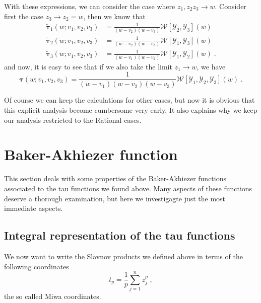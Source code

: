 \documentclass[a4paper,12pt]{amsart}
\begin{document}
With these expressions, we can consider the case where \(z_1, z_2 z_3
\to w\). Consider first the case \(z_3 \to z_2 = w\), then  
we know that 
\begin{equation}
  \begin{split}
  \tilde{\bm{\tau}}_1(w; v_1 , v_2, v_3) & = \frac{1}{(w - v_2)(w - v_3)}\mathcal{W}[\mathcal{Y}_2, \mathcal{Y}_3](w)\\
  \tilde{\bm{\tau}}_2(w; v_1 , v_2, v_3) & = \frac{1}{(w - v_2)(w - v_3)}\mathcal{W}[\mathcal{Y}_1, \mathcal{Y}_3](w)\\
  \tilde{\bm{\tau}}_3(w; v_1 , v_2, v_3) & = \frac{1}{(w - v_1)(w - v_2)}\mathcal{W}[\mathcal{Y}_1, \mathcal{Y}_2](w)
  \; .
  \end{split}
\end{equation}
and now, it is easy to see that if we also take the limit \(z_1\to w\), we have
\begin{equation}
  \bm{\tau}(w; v_1 , v_2, v_3) = 
  \frac{1}{(w - v_1)(w - v_2)(w - v_3)} \mathcal{W}[\mathcal{Y}_1, \mathcal{Y}_2, \mathcal{Y}_3](w)\; .
\end{equation}

Of course we can keep the calculations for other cases, but now it is obvious that
this explicit analysis become cumbersome very early. It also explains why we
keep our analysis restricted to the Rational cases. 


\section{Baker-Akhiezer function}

This section deals with some properties of the Baker-Akhiezer
functions associated to the tau functions we found above.  Many
aspects of these functions deserve a thorough examination, but here we
investigagte just the most immediate aspects.

\subsection{Integral representation of the tau functions}

We now want to write the Slavnov products we defined above in terms of
the following coordinates
\begin{equation}
  t_p = \frac{1}{p}\sum_{j=1}^n z_j^p\; ,
\end{equation}
the so called Miwa coordinates.
\end{document}

